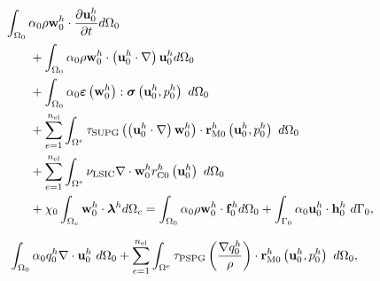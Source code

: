 \documentclass[tese_patricia]{subfiles}
\begin{document}
\begin{align}
	\begin{split}
		&\int_{\domain_0} \arlequinWFGlobal \density \wglobalh \cdot \frac{\partial\uglobalh}{\partial t} d\domain_{0} \\ 
		&\qquad+
		\int_{\domain_0} \arlequinWFGlobal \density \wglobalh \cdot  \left(\uglobalh \cdot \nabla\right) \uglobalh d\domain_{0}  \\ 
		&\qquad+	
		\int_{\domain_{0}} \arlequinWFGlobal \straintensor \left(\wglobalh\right) : \stresstensor \left(\uglobalh,\pglobalh\right)\ d\domain_{0} 
		 \\ 
		&\qquad+ \sum_{e=1}^{\nel} \int_{\domainE} \SUPG  \left(\left(\uglobalh \cdot \nabla \right) \wglobalh\right) \cdot \resMomGlobal\left(\uglobalh,\pglobalh \right)\  d\domain_{0} \\ 
		&\qquad+\sum_{e=1}^{\nel} \int_{\domainE} \LSIC \nabla \cdot \wglobalh \resPreGlobal 
		 \left(\uglobalh\right)\  d\domain_{0} \\
		 &\qquad+ \chi_{0} \int_{\domain_c} \wglobalh \cdot \lagrangeMultiplier^{h} d\domain_{c}  = \int_{\domain_0} \arlequinWFGlobal \density \wglobalh \cdot  \sbodyforce_{0}^{h} d\domain_{0} + \int_{\boundary_{0}} \arlequinWFGlobal \uglobalh \cdot \straction_{0}^{h}\ d\boundary_{0},
		\label{eq:FinalSystem0}
	\end{split}
\end{align}


\begin{align}
	\begin{split}
		&	\int_{\Omega_{0}} \alpha_0 q_0^h \nabla \cdot \mathbf{u}_0^h \ d\Omega_{0} +
\sum_{e=1}^{n_{\mathrm{el}}} \int_{\Omega^e} \tau_{\mathrm{PSPG}} \left(\frac{\nabla q_0^h}{\rho}\right) \cdot \mathbf{r}_{\mathrm{M0}}^{h}\left(\mathbf{u}_0^h,p_0^h\right) \  d\Omega_{0},
		\label{eq:RC0}
	\end{split}
\end{align}
\end{document}

